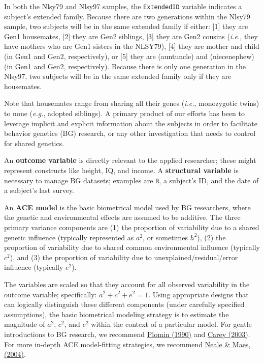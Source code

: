 \documentclass[smallextended]{svjour3}       %
\begin{document}
In both the Nlsy79 and Nlsy97 samples, the \texttt{ExtendedID} variable
indicates a subject's extended family. Because there are two generations
within the Nlsy79 sample, two subjects will be in the same extended
family if either: {[}1{]} they are Gen1 housemates, {[}2{]} they are
Gen2 siblings, {[}3{]} they are Gen2 cousins (\emph{i.e.}, they have
mothers who are Gen1 sisters in the NLSY79), {[}4{]} they are mother and
child (in Gen1 and Gen2, respectively), or {[}5{]} they are
(aunt\textbar uncle) and (niece\textbar nephew) (in Gen1 and Gen2,
respectively). Because there is only one generation in the Nlsy97, two
subjects will be in the same extended family only if they are
housemates.

Note that housemates range from sharing all their genes (\emph{i.e.},
monozygotic twins) to none (\emph{e.g.}, adopted siblings). A primary
product of our efforts has been to leverage implicit and explicit
information about the subjects in order to facilitate behavior genetics
(BG) research, or any other investigation that needs to control for
shared genetics.

An \textbf{outcome variable} is directly relevant to the applied
researcher; these might represent constructs like height, IQ, and
income. A \textbf{structural variable} is necessary to manage BG
datasets; examples are \texttt{R}, a subject's ID, and the date of a
subject's last survey.

An \textbf{ACE model} is the basic biometrical model used by BG
researchers, where the genetic and environmental effects are assumed to
be additive. The three primary variance components are (1) the
proportion of variability due to a shared genetic influence (typically
represented as \(a^2\), or sometimes \(h^2\)), (2) the proportion of
variability due to shared common environmental influence (typically
\(c^2\)), and (3) the proportion of variability due to
unexplained/residual/error influence (typically \(e^2\)).

The variables are scaled so that they account for all observed
variability in the outcome variable; specifically:
\(a^2 + c^2 + e^2 = 1\). Using appropriate designs that can logically
distinguish these different components (under carefully specified
assumptions), the basic biometrical modeling strategy is to estimate the
magnitude of \(a^2\), \(c^2\), and \(e^2\) within the context of a
particular model. For gentle introductions to BG research, we recommend
\href{https://books.google.com/books?id=r7AgAQAAIAAJ\&source=gbs_navlinks_s}{Plomin
(1990)} and
\href{https://www.colorado.edu/psych-neuro/gregory-carey}{Carey (2003)}.
For more in-depth ACE model-fitting strategies, we recommend
\href{http://ibgwww.colorado.edu/workshop2006/cdrom/HTML/book2004a.pdf}{Neale
\& Maes, (2004)}.
\end{document}

